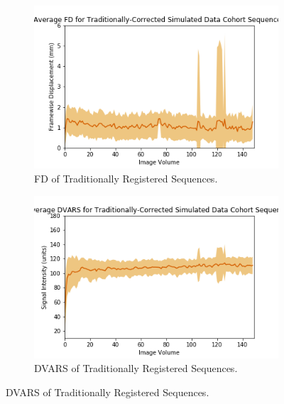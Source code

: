 \begin{figure}[]
	\begin{subfigure}{0.4\textwidth}
		\centering
		\includegraphics[width=1.0\textwidth]{6/figures/spectr-trad-fd-150.png}
		\caption{FD of Traditionally Registered Sequences.}
	\end{subfigure}
	\hspace{0.05\textwidth}
	\begin{subfigure}{0.4\textwidth}
		\centering
		\includegraphics[width=1.0\textwidth]{6/figures/spectr-trad-dvars-150.png}
		\caption{DVARS of Traditionally Registered Sequences.}
	\end{subfigure}
	

\end{figure}
